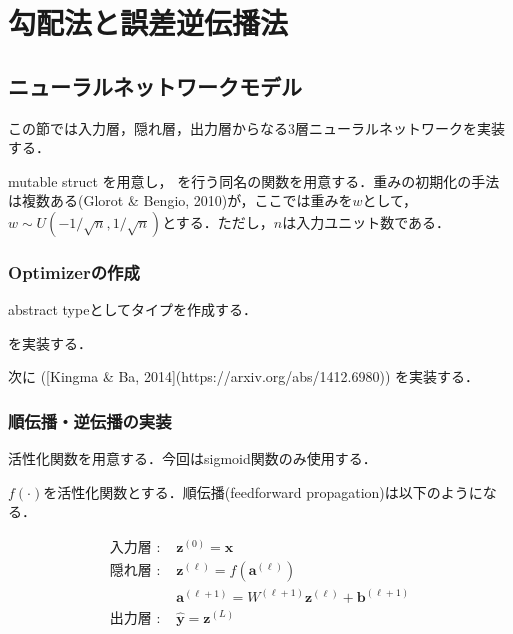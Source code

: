 \section{勾配法と誤差逆伝播法}
\textbf{}
\subsection{ニューラルネットワークモデル}
この節では入力層，隠れ層，出力層からなる3層ニューラルネットワークを実装する．


mutable struct を用意し，\textbf{} を行う同名の関数を用意する．重みの初期化の手法は複数ある(Glorot & Bengio, 2010)が，ここでは重みを$w$として，$w \sim U\left(-1/\sqrt{n}, 1/\sqrt{n}\right)$とする．ただし，$n$は入力ユニット数である．
\subsubsection{Optimizerの作成}
abstract typeとしてタイプを作成する．

\textbf{} を実装する．

次に\textbf{} ([Kingma & Ba, 2014](https://arxiv.org/abs/1412.6980)) を実装する．

\subsubsection{順伝播・逆伝播の実装}
活性化関数を用意する．今回はsigmoid関数のみ使用する．

$f(\cdot)$を活性化関数とする．順伝播(feedforward propagation)は以下のようになる．


\begin{align}
\text{入力層 : }&\mathbf{z}^{(0)}=\mathbf{x}\\
\text{隠れ層 : }&\mathbf{z}^{(\ell)}=f\left(\mathbf{a}^{(\ell)}\right)\\
&\mathbf{a}^{(\ell+1)}=W^{(\ell+1)}\mathbf{z}^{(\ell)}+\mathbf{b}^{(\ell+1)}\\
\text{出力層 : }&\hat{\mathbf{y}}=\mathbf{z}^{(L)}
\end{align}


